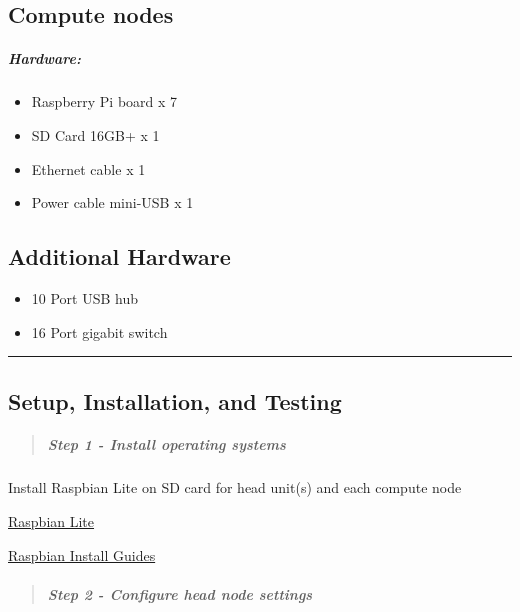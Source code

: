 \documentclass[]{article}
\providecommand{\tightlist}{%
  \setlength{\itemsep}{0pt}\setlength{\parskip}{0pt}}
\let\oldsubparagraph\subparagraph
\renewcommand{\subparagraph}[1]{\oldsubparagraph{#1}\mbox{}}
\begin{document}
\subsection{Compute nodes}\label{compute-nodes}

\subparagraph{Hardware:}\label{hardware-1}

\begin{itemize}
\tightlist
\item
  Raspberry Pi board x 7
\item
  SD Card 16GB+ x 1
\item
  Ethernet cable x 1
\item
  Power cable mini-USB x 1
\end{itemize}

\subsection{Additional Hardware}\label{additional-hardware}

\begin{itemize}
\tightlist
\item
  10 Port USB hub
\item
  16 Port gigabit switch
\end{itemize}

\begin{center}\rule{0.5\linewidth}{\linethickness}\end{center}

\subsection{Setup, Installation, and
Testing}\label{setup-installation-and-testing}

\begin{quote}
\mbox{}%
\subparagraph{Step 1 - Install operating
systems}\label{step-1---install-operating-systems}
\end{quote}

Install Raspbian Lite on SD card for head unit(s) and each compute node

\href{https://www.raspberrypi.org/downloads/raspbian/}{Raspbian Lite}

\href{https://www.raspberrypi.org/documentation/installation/installing-images/}{Raspbian
Install Guides}

\begin{quote}
\mbox{}%
\subparagraph{Step 2 - Configure head node
settings}\label{step-2---configure-head-node-settings}
\end{quote}
\end{document}
